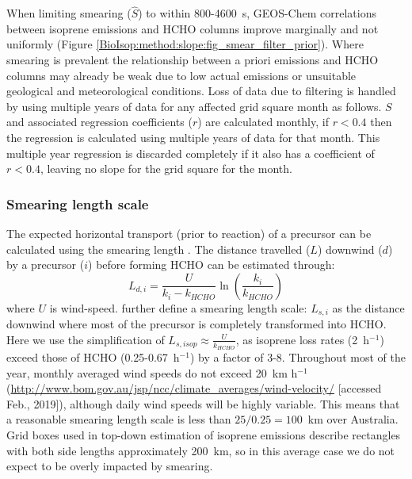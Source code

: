       
      When limiting smearing ($\hat{S}$) to within 800-4600~s, GEOS-Chem correlations between isoprene emissions and HCHO columns improve marginally and not uniformly (Figure \ref{BioIsop:method:slope:fig_smear_filter_prior}). 
      Where smearing is prevalent the relationship between a priori emissions and HCHO columns may already be weak due to low actual emissions or unsuitable geological and meteorological conditions.
      Loss of data due to filtering is handled by using multiple years of data for any affected grid square month as follows.
      $S$ and associated regression coefficients ($r$) are calculated monthly, if $r<0.4$ then the regression is calculated using multiple years of data for that month.
      This multiple year regression is discarded completely if it also has a coefficient of $r<0.4$, leaving no slope for the grid square for the month.
      
    \subsubsection{Smearing length scale}
    
      
      The expected horizontal transport (prior to reaction) of a precursor can be calculated using the smearing length \parencite{Palmer2003}.
      The distance travelled ($L$) downwind ($d$) by a precursor ($i$) before forming HCHO can be estimated through:
      \begin{equation*}
        L_{d,i} = \frac{U}{k_i - k_{HCHO}} \ln{ \left( \frac{k_i}{k_{HCHO}} \right) }
      \end{equation*}
      where $U$ is wind-speed.
      \textcite{Palmer2003} further define a smearing length scale: $L_{s,i}$ as the distance downwind where most of the precursor is completely transformed into HCHO.
      Here we use the simplification of $L_{s,isop} \approx \frac{U}{k_{HCHO}}$, as isoprene loss rates (2~h$^{-1}$) exceed those of HCHO (0.25-0.67~h$^{-1}$) by a factor of 3-8.
      Throughout most of the year, monthly averaged wind speeds do not exceed 20~km h$^{-1}$ (\url{http://www.bom.gov.au/jsp/ncc/climate_averages/wind-velocity/} [accessed Feb., 2019]), although daily wind speeds will be highly variable.
      This means that a reasonable smearing length scale is less than $25 / 0.25 = 100$~km over Australia.
      Grid boxes used in top-down estimation of isoprene emissions describe rectangles with both side lengths approximately 200~km, so in this average case we do not expect to be overly impacted by smearing.
       
